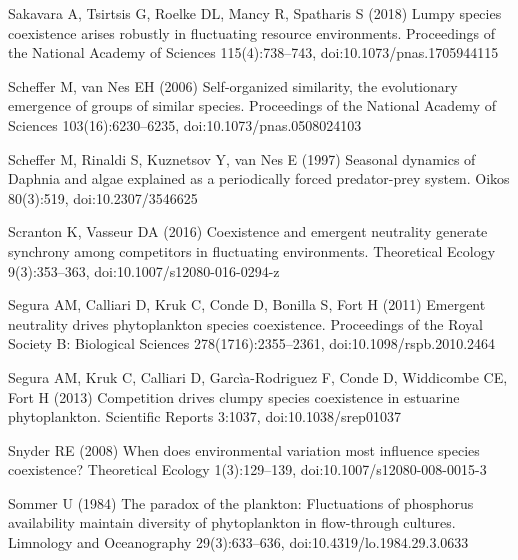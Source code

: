 \documentclass[a4paper,12pt]{article}
\begin{document}
\begin{thebibliography}{68}
Sakavara A, Tsirtsis G, Roelke DL, Mancy R, Spatharis S (2018) Lumpy species
  coexistence arises robustly in fluctuating resource environments. Proceedings
  of the National Academy of Sciences 115(4):738--743,
  doi:{10.1073/pnas.1705944115}

Scheffer M, van Nes EH (2006) Self-organized similarity, the evolutionary
  emergence of groups of similar species. Proceedings of the National Academy
  of Sciences 103(16):6230--6235, doi:{10.1073/pnas.0508024103}

Scheffer M, Rinaldi S, Kuznetsov Y, van Nes E (1997) Seasonal dynamics of
  {Daphnia} and algae explained as a periodically forced predator-prey system.
  Oikos 80(3):519, doi:{10.2307/3546625}

Scranton K, Vasseur DA (2016) Coexistence and emergent neutrality generate
  synchrony among competitors in fluctuating environments. Theoretical Ecology
  9(3):353--363, doi:{10.1007/s12080-016-0294-z}

Segura AM, Calliari D, Kruk C, Conde D, Bonilla S, Fort H (2011) Emergent
  neutrality drives phytoplankton species coexistence. Proceedings of the Royal
  Society B: Biological Sciences 278(1716):2355--2361,
  doi:{10.1098/rspb.2010.2464}

Segura AM, Kruk C, Calliari D, Garc\`{i}a-Rodriguez F, Conde D, Widdicombe CE,
  Fort H (2013) Competition drives clumpy species coexistence in estuarine
  phytoplankton. Scientific Reports 3:1037, doi:{10.1038/srep01037}

Snyder RE (2008) When does environmental variation most influence species
  coexistence? Theoretical Ecology 1(3):129--139,
  doi:{10.1007/s12080-008-0015-3}

Sommer U (1984) The paradox of the plankton: {Fluctuations} of phosphorus
  availability maintain diversity of phytoplankton in flow-through cultures.
  Limnology and Oceanography 29(3):633--636, doi:{10.4319/lo.1984.29.3.0633}


\end{thebibliography}
\end{document}

